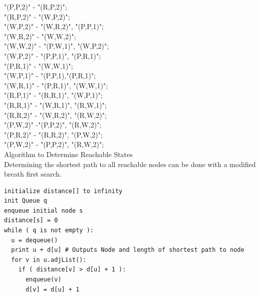 \documentclass[12pt,twoside]{article}
\begin{document}
\begin{problems}
\begin{problemparts}
        "(P,P,2)" - "(R,P,2)";\\

        "(R,P,2)" - "(W,P,2)";\\

        "(W,P,2)" - "(W,R,2)", "(P,P,1)";\\

        "(W,R,2)" - "(W,W,2)";\\

        "(W,W,2)" - "(P,W,1)", "(W,P,2)";\\

        "(W,P,2)" - "(P,P,1)", "(P,R,1)";\\

        "(P,R,1)" - "(W,W,1)";\\

        "(W,P,1)" - "(P,P,1),"(P,R,1)";\\

        "(W,R,1)" - "(P,R,1)", "(W,W,1)";\\

        "(R,P,1)" - "(R,R,1)", "(W,P,1)";\\

        "(R,R,1)" - "(W,R,1)", "(R,W,1)";\\
        
        "(R,R,2)" - "(W,R,2)", "(R,W,2)";\\
        
        "(P,W,2)" -"(P,P,2)", "(R,W,2)";\\
        
        "(P,R,2)" - "(R,R,2)", "(P,W,2)";\\
        
        "(P,W,2)" - "(P,P,2)", "(R,W,2)";\\

\problempart Algorithm to Determine Reachable States\\
Determining the shortest path to all reachable nodes can be done with a modified breath first search.\\
\begin{lstlisting}
initialize distance[] to infinity
init Queue q
enqueue initial node s
distance[s] = 0
while ( q is not empty ):
  u = dequeue()
  print u + d[u] # Outputs Node and length of shortest path to node
  for v in u.adjList():
    if ( distance[v] > d[u] + 1 ):
      enqueue(v)
      d[v] = d[u] + 1
\end{lstlisting}


\end{problemparts}
\end{problems}
\end{document}
